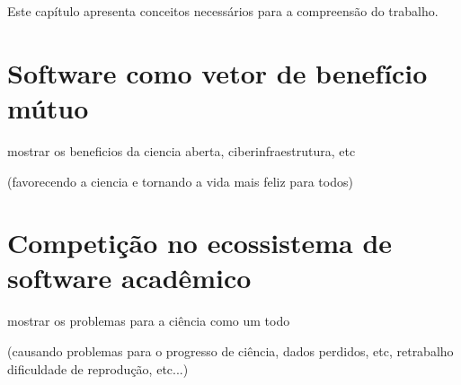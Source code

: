 
{Este capítulo apresenta conceitos necessários para a compreensão do trabalho.}
\label{fundamentacao}





\section{Software como vetor de benefício mútuo}

mostrar os beneficios da ciencia aberta, ciberinfraestrutura, etc

(favorecendo a ciencia e tornando a vida mais feliz para todos)

\section{Competição no ecossistema de software acadêmico}

mostrar os problemas para a ciência como um todo

(causando problemas para o progresso de ciência, dados perdidos, etc, retrabalho
dificuldade de reprodução, etc...)

%
%
%

